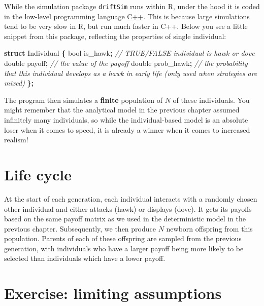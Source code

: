 \documentclass[
]{book}
\newenvironment{Shaded}{\begin{snugshade}}{\end{snugshade}}
\newcommand{\CommentTok}[1]{\textcolor[rgb]{0.56,0.35,0.01}{\textit{#1}}}
\newcommand{\DataTypeTok}[1]{\textcolor[rgb]{0.13,0.29,0.53}{#1}}
\newcommand{\KeywordTok}[1]{\textcolor[rgb]{0.13,0.29,0.53}{\textbf{#1}}}
\newcommand{\NormalTok}[1]{#1}
\newcommand{\OperatorTok}[1]{\textcolor[rgb]{0.81,0.36,0.00}{\textbf{#1}}}
\begin{document}
While the simulation package \texttt{driftSim} runs within R, under the hood it is coded in the low-level programming language \href{https://cplusplus.com/doc/tutorial/}{C++}. This is because large simulations tend to be very slow in R, but run much faster in C++. Below you see a little snippet from this package, reflecting the properties of single individual:

\begin{Shaded}
\begin{Highlighting}[]
\KeywordTok{struct}\NormalTok{ Individual }\OperatorTok{\{}
    \DataTypeTok{bool}\NormalTok{ is\_hawk}\OperatorTok{;} \CommentTok{// TRUE/FALSE individual is hawk or dove}
    \DataTypeTok{double}\NormalTok{ payoff}\OperatorTok{;} \CommentTok{// the value of the payoff}
    \DataTypeTok{double}\NormalTok{ prob\_hawk}\OperatorTok{;} \CommentTok{// the probability that this individual develops as a hawk in early life (only used when strategies are mixed)}
\OperatorTok{\};}
\end{Highlighting}
\end{Shaded}

The program then simulates a \textbf{finite} population of \(N\) of these individuals. You might remember that the analytical model in the previous chapter assumed infinitely many individuals, so while the individual-based model is an absolute loser when it comes to speed, it is already a winner when it comes to increased realism!

\section{Life cycle}\label{life-cycle-1}

At the start of each generation, each individual interacts with a randomly chosen other individual and either attacks (hawk) or displays (dove). It gets its payoffs based on the same payoff matrix as we used in the deterministic model in the previous chapter. Subsequently, we then produce \(N\) newborn offspring from this population. Parents of each of these offspring are sampled from the previous generation, with individuals who have a larger payoff being more likely to be selected than individuals which have a lower payoff.

\section{Exercise: limiting assumptions}\label{exercise-limiting-assumptions}
\end{document}
